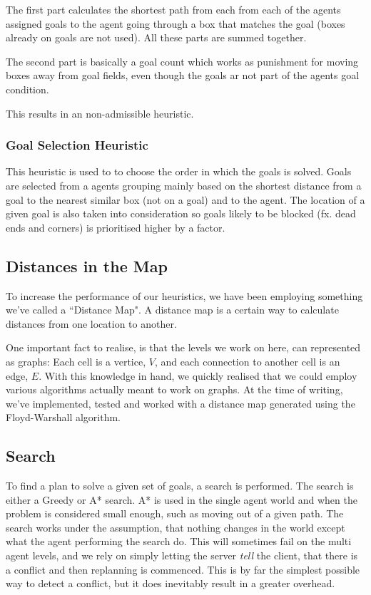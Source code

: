 \documentclass[letterpaper]{article}
\begin{document}
			The first part calculates the shortest path from each from each of the agents assigned goals to the agent going through a box that matches the goal (boxes already on goals are not used). All these parts are summed together.
			
			The second part is basically a goal count which works as punishment for moving boxes away from goal fields, even though the goals ar not part of the agents goal condition.
			
			This results in an non-admissible heuristic.
		
		\subsubsection{Goal Selection Heuristic}\label{goal2}
			This heuristic is used to to choose the order in which the goals is solved. Goals are selected from a agents grouping mainly based on the shortest distance from a goal to the nearest similar box (not on a goal) and to the agent. The location of a given goal is also taken into consideration so goals likely to be blocked (fx. dead ends and corners) is prioritised higher by a factor.

				
			
	\subsection{Distances in the Map}
		To increase the performance of our heuristics, we have been employing something we've called a ``Distance Map". A distance map is a certain way to calculate distances from one location to another.
			
		One important fact to realise, is that the levels we work on here, can represented as graphs: Each cell is a vertice, $V$, and each connection to another cell is an edge, $E$. With this knowledge in hand, we quickly realised that we could employ various algorithms actually meant to work on graphs. At the time of writing, we've implemented, tested and worked with a distance map generated using the Floyd-Warshall algorithm.

	\subsection{Search}
		\label{sec:search}
		To find a plan to solve a given set of goals, a search is performed. The search is either a Greedy or A* search. A* is used in the single agent world and when the problem is considered small enough, such as moving out of a given path. 
		The search works under the assumption, that nothing changes in the world except what the agent performing the search do. This will sometimes fail on the multi agent levels, and we rely on simply letting the server \emph{tell} the client, that there is a conflict and then replanning is commenced. This is by far the simplest possible way to detect a conflict, but it does inevitably result in a greater overhead. 
		
\end{document}
